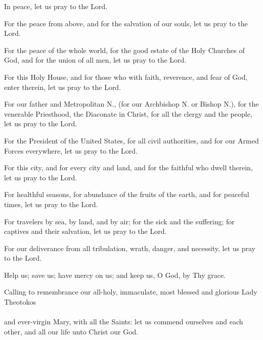 \documentclass[twoside, letterpaper, 12pt]{report}
\begin{document}
\begin{maybetwocolumns}
\begin{deacon}
\item In peace, let us pray to the Lord.
\end{deacon}

\begin{deacon}
\item For the peace from above, and for the salvation of our souls,
    let us pray to the Lord.
\end{deacon}

\begin{deacon}
\item For the peace of the whole world, for the good estate of the Holy Churches of God,
    and for the union of all men, let us pray to the Lord.
\item For this Holy House, and for those who with faith, reverence, and fear of God,
    enter therein, let us pray to the Lord.
\item For our father and Metropolitan N., (for our Archbishop N. or Bishop N.),
    for the venerable Priesthood, the Diaconate in Christ,
    for all the clergy and the people, let us pray to the Lord.
\item  For the President of the United States, for all civil authorities,
    and for our Armed Forces everywhere, let us pray to the Lord.
\item For this city, and for every city and land, and for the faithful who dwell
    therein, let us pray to the Lord.
\item For healthful seasons, for abundance of the fruits of the earth,
    and for peaceful times, let us pray to the Lord.
\item For travelers by sea, by land, and by air; for the sick and the suffering;
    for captives and their salvation, let us pray to the Lord.
\item For our deliverance from all tribulation, wrath, danger, and necessity,
    let us pray to the Lord.
\item  Help us; save us; have mercy on us; and keep us, O God, by Thy grace.
\item Calling to remembrance our all-holy, immaculate, most blessed and glorious Lady Theotokos
    \\
    \\
    and ever-virgin Mary, with all the Saints: let us commend ourselves and
    each other, and all our life unto Christ our God.
\end{deacon}


\end{maybetwocolumns}
\end{document}
